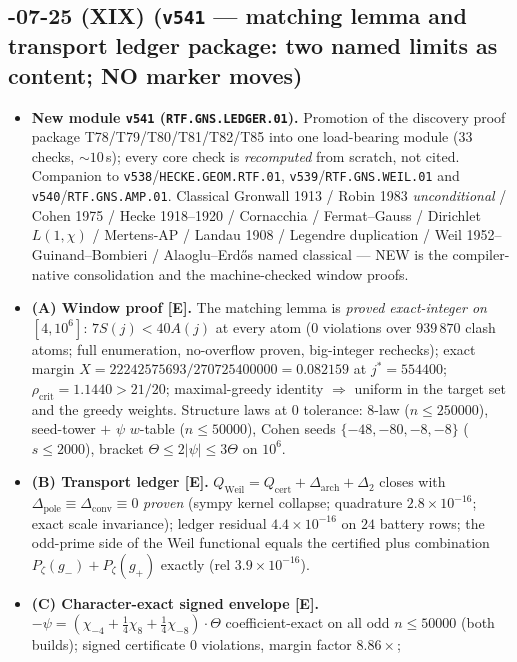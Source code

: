 \documentclass[11pt]{article}
\providecommand{\mE}{\textbf{[E]}}\providecommand{\mC}{\textbf{[C]}}
\begin{document}
\subsection*{-07-25 (XIX) (\texttt{v541} --- matching lemma and transport ledger package: two named limits as content; NO marker moves)}
\begin{itemize}[leftmargin=1.5em]
\item \textbf{New module \texttt{v541} (\texttt{RTF.GNS.LEDGER.01}).} Promotion of the discovery
proof package T78/T79/T80/T81/T82/T85 into one load-bearing module ($33$ checks, $\sim10$\,s);
every core check is \emph{recomputed} from scratch, not cited. Companion to
\texttt{v538}/\texttt{HECKE.GEOM.RTF.01}, \texttt{v539}/\texttt{RTF.GNS.WEIL.01} and
\texttt{v540}/\texttt{RTF.GNS.AMP.01}. Classical Gronwall 1913 / Robin 1983 \emph{unconditional} /
Cohen 1975 / Hecke 1918--1920 / Cornacchia / Fermat--Gauss / Dirichlet $L(1,\chi)$ / Mertens-AP /
Landau 1908 / Legendre duplication / Weil 1952--Guinand--Bombieri / Alaoglu--Erd\H{o}s named
classical --- NEW is the compiler-native consolidation and the machine-checked window proofs.
\item \textbf{(A) Window proof \mE.} The matching lemma is \emph{proved exact-integer on
$[4,10^6]$}: $7S(j)<40A(j)$ at every atom ($0$ violations over $939\,870$ clash atoms; full
enumeration, no-overflow proven, big-integer rechecks); exact margin
$X=22242575693/270725400000=0.082159$ at $j^*=554400$; $\rho_{\mathrm{crit}}=1.1440>21/20$;
maximal-greedy identity $\Rightarrow$ uniform in the target set and the greedy weights.
Structure laws at $0$ tolerance: $8$-law ($n\le250000$), seed-tower $+$ $\psi$ $w$-table
($n\le50000$), Cohen seeds $\{-48,-80,-8,-8\}$ ($s\le2000$), bracket
$\Theta\le2|\psi|\le3\Theta$ on $10^6$.
\item \textbf{(B) Transport ledger \mE.}
$Q_{\mathrm{Weil}}=Q_{\mathrm{cert}}+\Delta_{\mathrm{arch}}+\Delta_2$ closes with
$\Delta_{\mathrm{pole}}\equiv\Delta_{\mathrm{conv}}\equiv0$ \emph{proven} (sympy kernel collapse;
quadrature $2.8\times10^{-16}$; exact scale invariance); ledger residual
$4.4\times10^{-16}$ on $24$ battery rows; the odd-prime side of the Weil functional equals the
certified plus combination $P_\zeta(g_-)+P_\zeta(g_+)$ exactly (rel $3.9\times10^{-16}$).
\item \textbf{(C) Character-exact signed envelope \mE.}
$-\psi=(\chi_{-4}+\tfrac14\chi_8+\tfrac14\chi_{-8})\cdot\Theta$ coefficient-exact on all odd
$n\le50000$ (both builds); signed certificate $0$ violations, margin factor $8.86\times$;

\end{itemize}
\end{document}
